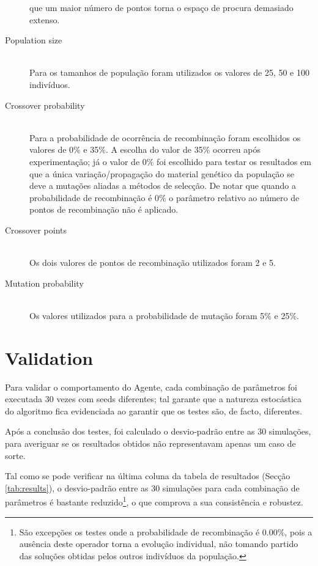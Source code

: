 \documentclass[a4paper]{article}
\begin{document}
\begin{description}
		que um maior número de pontos torna o espaço de procura demasiado extenso.
	\item [Population size] \hfill \\
		\indent Para os tamanhos de população foram utilizados os valores de 25, 50 e 100 indivíduos. %
	\item [Crossover probability] \hfill \\
		\indent Para a probabilidade de ocorrência de recombinação foram escolhidos os valores de 0\% e 35\%. A escolha do valor de 35\% ocorreu após
		experimentação; já o valor de 0\% foi escolhido para testar os resultados em que a única variação/propagação do material genético da população se deve
		a mutações aliadas a métodos de selecção. De notar que quando a probabilidade de recombinação é 0\% o parâmetro relativo ao número de pontos de recombinação
		não é aplicado.
	\item [Crossover points] \hfill \\
		\indent Os dois valores de pontos de recombinação utilizados foram 2 e 5. %
	\item [Mutation probability] \hfill \\
		\indent Os valores utilizados para a probabilidade de mutação foram 5\% e 25\%. %
\end{description}

\cleardoublepage

\section{Validation}
\indent \indent Para validar o comportamento do Agente, cada combinação de parâmetros foi executada 30 vezes com seeds diferentes;
tal garante que a natureza estocástica do algoritmo fica evidenciada ao garantir que os testes são, de facto, diferentes.

Após a conclusão dos testes, foi calculado o desvio-padrão entre as 30 simulações,
para averiguar se os resultados obtidos não representavam apenas um caso de sorte.

Tal como se pode verificar na última coluna da tabela de resultados (Secção \ref{tab:results}), o desvio-padrão entre as 30 simulações para cada combinação de parâmetros
é bastante reduzido\footnote[1]{São excepções os testes onde a probabilidade de recombinação é 0.00\%, pois a ausência deste operador torna a evolução individual,
não tomando partido das soluções obtidas pelos outros indivíduos da população.}, o que comprova a sua consistência e robustez.
\end{document}
